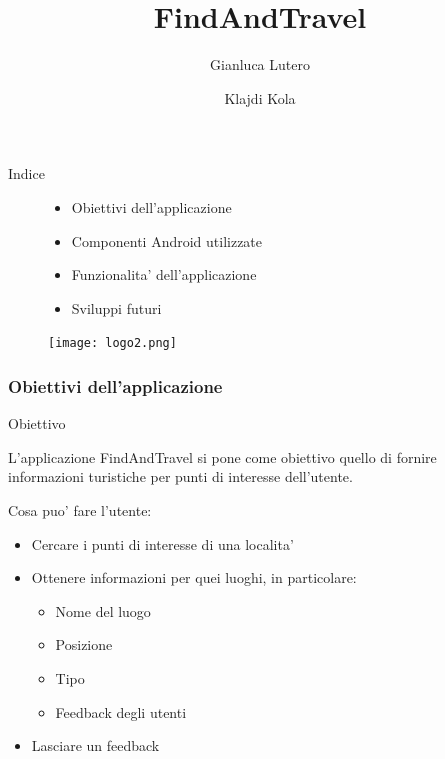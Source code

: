 \documentclass[10pt,a4paper]{beamer}
\title{FindAndTravel}
\author{Gianluca Lutero \and Klajdi Kola}
\institute{Universita' degli studi di Parma}
\date{}
\begin{document}
\begin{frame}
\maketitle
\end{frame}

\begin{frame}{Indice}
\begin{figure}

\begin{minipage}{0.47\textwidth}
   \begin{itemize}
      \item Obiettivi dell'applicazione
      \item Componenti Android utilizzate
      \item Funzionalita' dell'applicazione
      \item Sviluppi futuri
   \end{itemize}
\end{minipage}
\hfill 
\begin{minipage}{0.35\textwidth}

   \texttt{[image: logo2.png]}

\end{minipage}

\end{figure}
\end{frame}

\begin{frame}
\frametitle{Obiettivi dell'applicazione} 
    \begin{block}{Obiettivo}
    
    L'applicazione FindAndTravel si pone come obiettivo quello di fornire informazioni turistiche per punti di interesse dell'utente. 
    \end{block}      
Cosa puo' fare l'utente: 
   \begin{itemize}
    \item Cercare i punti di interesse di una localita'
    \item Ottenere informazioni per quei luoghi, in particolare:
    \begin{itemize}
         \item Nome del luogo
         \item Posizione
         \item Tipo
         \item Feedback degli utenti
    \end{itemize}        
    \item Lasciare un feedback   
   \end{itemize}    
\end{frame}
\end{document}
